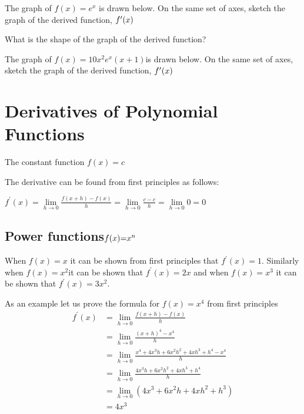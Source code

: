  The
graph of $f (x) =e^{x}$ is drawn below. On the same set of axes, sketch the graph of the derived function, $f^{ \prime } (x)\vspace{+0.500000cm}$ 

   
\setlength\fboxrule{0.01in}\setlength\fboxsep{0.2in}
\vspace{0.5cm} 

What is the shape of the graph of the derived function?\vspace{1cm}


The graph of $f (x) =10 x^{2} e^{x} (x +1)$is drawn below. On the same set of axes, sketch the graph of the derived function, $f^{ \prime } (x)\vspace{+0.500000cm}$ 

   
\setlength\fboxrule{0.01in}\setlength\fboxsep{0.2in}
 

\section{Derivatives of Polynomial Functions}
The constant function $f (x) =c$ 

The derivative can be found from first principles as follows: 


\begin{center}
$f^{ \prime } (x) =\underset{h \rightarrow 0}{\lim }\frac{f (x +h) -f (x)}{h} =\underset{h \rightarrow 0}{\lim }\frac{c -c}{h} =\underset{h \rightarrow 0}{\lim }0 =0$
\end{center}\par


\subsection{Power functions{\Large }${\Large f} ({\Large x}){\Large  =}{\Large x}^{n}$}
\bigskip When $f (x) =x$ it can be shown from first principles that $f^{ \prime } (x) =1$. Similarly when $f (x) =x^{2\text{}}$it can be shown that $f^{ \prime } (x) =2 x$ and when $f (x) =x^{3}$ it can be shown that $f^{ \prime } (x) =3 x^{2}$. 

As an example let us prove the formula for $f (x) =x^{4}$ from first principles
\begin{align*}f^{ \prime } (x) &  = \underset{h \rightarrow 0}{\lim }\frac{f (x +h) -f (x)}{h} \\
 &  = \underset{h \rightarrow 0}{\lim }\frac{(x +h)^{4} -x^{4}}{h} \\
 &  = \underset{h \rightarrow 0}{\lim }\frac{x^{4} +4 x^{3} h +6 x^{2} h^{2} +4 x h^{3} +h^{4} -x^{4}}{h} \\
 &  = \underset{h \rightarrow 0}{\lim }\frac{4 x^{3} h +6 x^{2} h^{2} +4 x h^{3} +h^{4}}{h} \\
 &  = \underset{h \rightarrow 0}{\lim }(4 x^{3} +6 x^{2} h +4 x h^{2} +h^{3}) \\
 &  = 4 x^{3}\end{align*}

